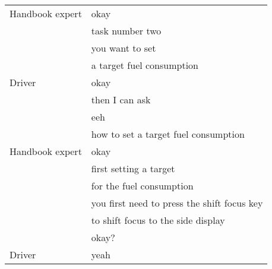 \begin{table}[H]
\begin{tabular}{p{3cm}p{8cm}}
Handbook expert & okay                                                                                                                  \\
 & task number two                                                                                                       \\
 & you want to set                                                                                                       \\
 & a target fuel consumption                                                                                              \\
Driver          & okay                                                                                                                  \\
          & then I can ask                                                                                                        \\
          & eeh                                                                                                                   \\
          & how to set a target fuel consumption                                                                                   \\
Handbook expert & okay                                                                                                                  \\
                  & first setting a target                                                                                                \\
                 & for the fuel consumption                                                                                               \\
                  & you first need to press the shift focus key                                                                           \\
                  & to shift focus to the side display                                                                                    \\
                  & okay?                                                                                                                 \\
Driver          & yeah                                                                                                                  \\

\end{tabular}
\end{table}
